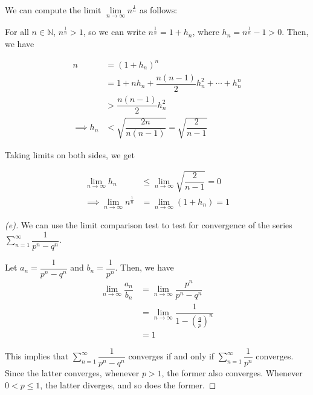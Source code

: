 \documentclass{article}
\begin{document}

\begin{remark*}[$\lim n^{\frac{1}{n}} = 1$]
    We can compute the limit $\lim\limits_{n \to \infty} n^{\frac{1}{n}}$ as follows:

    For all $n \in \mathbb{N}$, $n^{\frac{1}{n}} > 1$, so we can write $n^{\frac{1}{n}} = 1 + h_n$, where $h_n = n^{\frac{1}{n}} - 1 > 0$. Then, we have

    \begin{align*}
        n &= (1 + h_n)^n \\
        &= 1 + nh_n + \dfrac{n(n-1)}{2} h_n^2 + \cdots + h_n^n \\
        &> \dfrac{n(n-1)}{2} h_n^2 \\
        \implies h_n &< \sqrt{\dfrac{2n}{n(n-1)}} = \sqrt{\dfrac{2}{n-1}}
    \end{align*}

    Taking limits on both sides, we get

    \begin{align*}
        \lim\limits_{n \to \infty} h_n &\leq \lim\limits_{n \to \infty} \sqrt{\dfrac{2}{n-1}} = 0 \\
        \implies \lim\limits_{n \to \infty} n^{\frac{1}{n}} &= \lim\limits_{n \to \infty} (1 + h_n) = 1
    \end{align*}
\end{remark*}

\begin{proof}[(e)]
    We can use the limit comparison test to test for convergence of the series $\displaystyle\sum_{n=1}^{\infty} \dfrac{1}{p^n - q^n}$.

    Let $a_n = \dfrac{1}{p^n - q^n}$ and $b_n = \dfrac{1}{p^n}$. Then, we have
    \begin{align*}
        \lim\limits_{n \to \infty} \dfrac{a_n}{b_n} 
        &= \lim\limits_{n \to \infty} \dfrac{p^n}{p^n - q^n} \\
        &= \lim\limits_{n \to \infty} \dfrac{1}{1 - \left(\frac{q}{p}\right)^n} \\
        &= 1
    \end{align*}

    This implies that $\displaystyle\sum_{n=1}^{\infty} \dfrac{1}{p^n - q^n}$ converges if and only if $\displaystyle\sum_{n=1}^{\infty} \dfrac{1}{p^n}$ converges. Since the latter converges, whenever $p > 1$, the former also converges. Whenever $0 < p \leq 1$, the latter diverges, and so does the former.
\end{proof}
\end{document}
